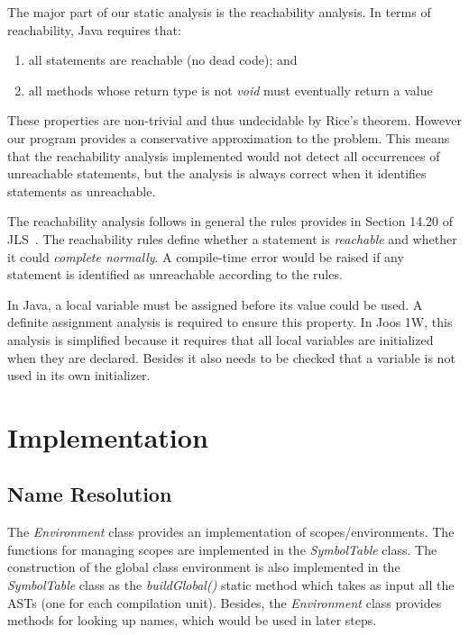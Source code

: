 \documentclass[a4paper, notitlepage]{report}
\begin{document}
The major part of our static analysis is the reachability analysis. In terms of reachability, Java requires that:
\begin{enumerate}
\item all statements are reachable (no dead code); and 
\item all methods whose return type is not \emph{void} must eventually return a value
\end{enumerate}
These properties are non-trivial and thus undecidable by Rice's theorem. However our program provides a conservative approximation to the problem. This means that the reachability analysis implemented would not detect all occurrences of unreachable statements, but the analysis is always correct when it identifies statements as unreachable.

The reachability analysis follows in general the rules provides in Section 14.20 of JLS~\cite{gosling2000java}. The reachability rules define whether a statement is \emph{reachable} and whether it could \emph{complete normally}. A compile-time error would be raised if any statement is identified as unreachable according to the rules.

In Java, a local variable must be assigned before its value could be used. A definite assignment analysis is required to ensure this property. In Joos 1W, this analysis is simplified because it requires that all local variables are initialized when they are declared. Besides it also needs to be checked that a variable is not used in its own initializer.

\clearpage
\chapter{Implementation}
\label{implementation}

\section{Name Resolution}


The \emph{Environment} class provides an implementation of scopes/environments. The functions for managing scopes are implemented in the \emph{SymbolTable} class. The construction of the global class environment is also implemented in the \emph{SymbolTable} class as the \emph{buildGlobal()} static method which takes as input all the ASTs (one for each compilation unit). Besides, the \emph{Environment} class provides methods for looking up names, which would be used in later steps.
\end{document}
